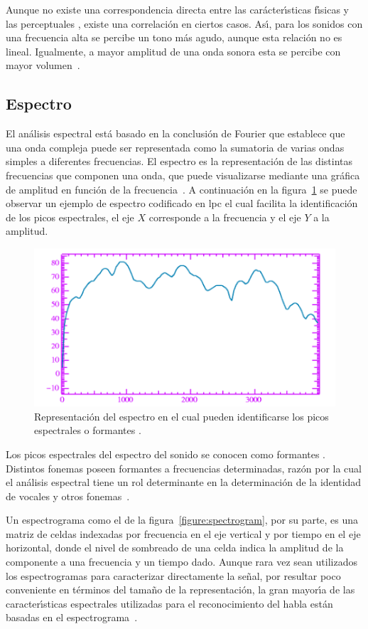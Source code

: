 Aunque no existe una correspondencia directa entre las car\'acter{\'\i}sticas f{\'\i}sicas y las perceptuales 
\cite{SematPhysics1958}, existe una correlaci\'on en ciertos casos. As{\'\i}, para los sonidos con una frecuencia alta se 
percibe un tono m\'as agudo, aunque esta relaci\'on no es lineal. Igualmente, a mayor amplitud de una onda sonora esta se 
percibe con mayor \mbox{volumen \cite{YoungUniversity2007}}.

\subsection{Espectro}
El an\'alisis espectral est\'a basado en la conclusi\'on de Fourier que establece que una onda compleja puede ser 
representada como la sumatoria de varias ondas simples a diferentes frecuencias. El espectro es la representaci\'on de las 
distintas frecuencias que componen una onda, que puede visualizarse mediante una gr\'afica de amplitud en funci\'on de la 
\mbox{frecuencia \cite{Jurafsky}}. A continuaci\'on en la figura~\ref{figure:formants} se puede observar un ejemplo
de espectro codificado en \gls{lpc} \cite{KesarkarFeature2003} el cual facilita la identificaci\'on de los picos
espectrales, el eje $X$ corresponde a la frecuencia y el eje $Y$ a la amplitud.

\begin{figure}[H]
\centering
\includegraphics[width=0.6\linewidth]{./graphics/formants.png}
\caption{Representaci\'on del espectro en el cual pueden identificarse los picos espectrales o formantes 
\cite{Jurafsky}.}
\label{figure:formants}
\end{figure}

Los picos espectrales del espectro del sonido se conocen como formantes \cite{Fant1960acoustic}. Distintos fonemas poseen 
formantes a frecuencias determinadas, raz\'on por la cual el an\'alisis espectral tiene un rol determinante en la 
determinaci\'on de la identidad de vocales y otros \mbox{fonemas \cite{LadefogedCourse2006}}.

Un espectrograma como el de la figura~\ref{figure:spectrogram}, por su parte, es una matriz de celdas indexadas por
frecuencia en el eje vertical y por tiempo en el eje 
horizontal, donde el nivel de sombreado de una celda indica la amplitud de la componente a una frecuencia y un tiempo 
dado. Aunque rara vez sean utilizados los espectrogramas para caracterizar directamente la se\~nal,
por resultar poco conveniente en t\'erminos del tama\~no de la representaci\'on,
la gran mayor{\'\i}a de las caracter{\'\i}sticas espectrales utilizadas para el reconocimiento del 
habla est\'an basadas en el \mbox{espectrograma \cite{Ellis08anintroduction}}.

